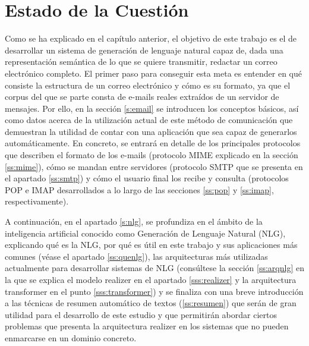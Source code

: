\chapter{Estado de la Cuestión}
\label{cap:estadoDeLaCuestion}


Como se ha explicado en el capítulo anterior, el objetivo de este trabajo es el de desarrollar un sistema de generación de lenguaje natural capaz de, dada una representación semántica de lo que se quiere transmitir, redactar un correo electrónico completo. El primer paso para conseguir esta meta es entender en qué consiste la estructura de un correo electrónico y cómo es su formato, ya que el corpus del que se parte consta de e-mails reales extraídos de un servidor de mensajes. Por ello, en la sección \ref{s:email} se introducen los conceptos básicos, así como datos acerca de la utilización actual de este método de comunicación que demuestran la utilidad de contar con una aplicación que sea capaz de generarlos automáticamente. En concreto, se entrará en detalle de los principales protocolos que describen el formato de los e-mails (protocolo MIME explicado en la sección \ref{ss:mime}), cómo se mandan entre servidores (protocolo SMTP que se presenta en el apartado \ref{ss:smtp}) y cómo el usuario final los recibe y consulta (protocolos POP e IMAP desarrollados a lo largo de las secciones \ref{ss:pop} y \ref{ss:imap}, respectivamente). 

A continuación, en el apartado \ref{s:nlg}, se profundiza en el ámbito de la inteligencia artificial conocido como Generación de Lenguaje Natural (NLG), explicando qué es la NLG, por qué es útil en este trabajo y sus aplicaciones más comunes (véase el apartado \ref{ss:quenlg}), las arquitecturas más utilizadas actualmente para desarrollar sistemas de NLG (consúltese la sección \ref{ss:arqnlg} en la que se explica el modelo realizer en el apartado \ref{sss:realizer} y la arquitectura transformer en el punto \ref{sss:transformer}) y se finaliza con una breve introducción a las técnicas de resumen automático de textos (\ref{ss:resumen}) que serán de gran utilidad para el desarrollo de este estudio y que permitirán abordar ciertos problemas que presenta la arquitectura realizer en los sistemas que no pueden enmarcarse en un dominio concreto.




